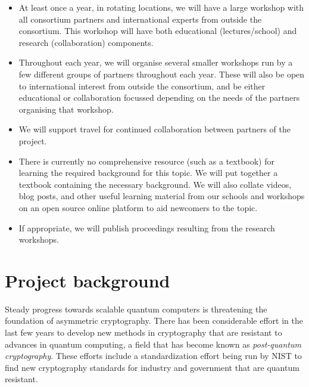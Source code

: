 \documentclass{article}
\begin{document}
\begin{itemize}
	\item At least once a year, in rotating locations, 
			we will have a large workshop with all consortium partners and 
			international experts from outside the consortium. 
			This workshop will have both educational (lectures/school) 
			and research (collaboration) components.
	\item Throughout each year, 
			we will organise several smaller workshops run by a few 
			different groups of partners throughout each year. 
			These will also be open to international interest 
			from outside the consortium, and be
			either educational or collaboration focussed depending 
			on the needs of the partners organising that workshop.
	\item We will support travel for continued collaboration 
			between partners of the project.
	\item There is currently no comprehensive resource (such as a textbook)
			for learning the required background for this topic.
			We will put together a textbook containing the necessary background.
			We will also collate videos, blog posts, 
			and other useful learning material from our schools and workshops
			on an open source online platform to aid newcomers to the topic.
	\item If appropriate, we will 
			publish proceedings resulting from the research workshops. 
\end{itemize}



\section{Project background}

Steady progress towards scalable quantum computers is threatening the foundation of asymmetric cryptography. 
There has been considerable effort in the last few years to develop new methods in cryptography that are resistant to advances in quantum computing, a field that has become known as \emph{post-quantum cryptography}. 
These efforts include a standardization effort being run by NIST \cite{NIST-comp} to find new cryptography standards for industry and government that are quantum resistant.
\end{document}
